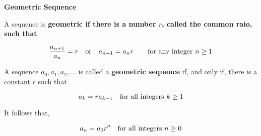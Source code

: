 {\bf Geometric Sequence}
\vskip 6pt

A sequence is {\bf geometric if there is a number $r$, called the {\bf common raio}, such that}

$${a_{n+1}\over a_n}=r \quad\hbox{or}\quad a_{n+1}=a_nr \qquad\hbox{for any integer $n\geq 1$} $$

\vskip 2cm
A sequence $a_0,a_1,a_2,\ldots$ is called a {\bf geometric sequence} if, and only if, there is a constant $r$ such that

$$a_k=ra_{k-1}\quad\hbox{for all integers $k\geq 1$}$$

It follows that,

$$a_n=a_0r''\quad\hbox{for all integers $n\geq 0$}$$

\vfill\eject

